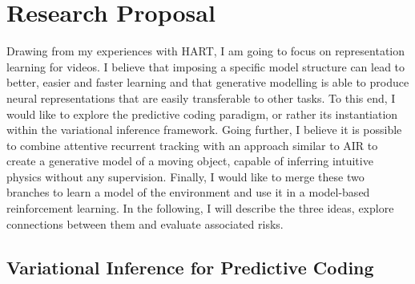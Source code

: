 \section{Research Proposal}
\label{sec:proposal}


    Drawing from my experiences with HART, I am going to focus on representation learning for videos. I believe that imposing a specific model structure can lead to better, easier and faster learning and that generative modelling is able to produce neural representations that are easily transferable to other tasks. To this end, I would like to explore the predictive coding paradigm, or rather its instantiation within the variational inference framework. 
    Going further, I believe it is possible to combine attentive recurrent tracking with an approach similar to AIR \citep{Eslami2016} to create a generative model of a moving object, capable of inferring intuitive physics without any supervision.
    Finally, I would like to merge these two branches to learn a model of the environment and use it in a model-based reinforcement learning. In the following, I will describe the three ideas, explore connections between them and evaluate associated risks.
    
    
\subsection{Variational Inference for Predictive Coding}
\label{sec:pred}
   
